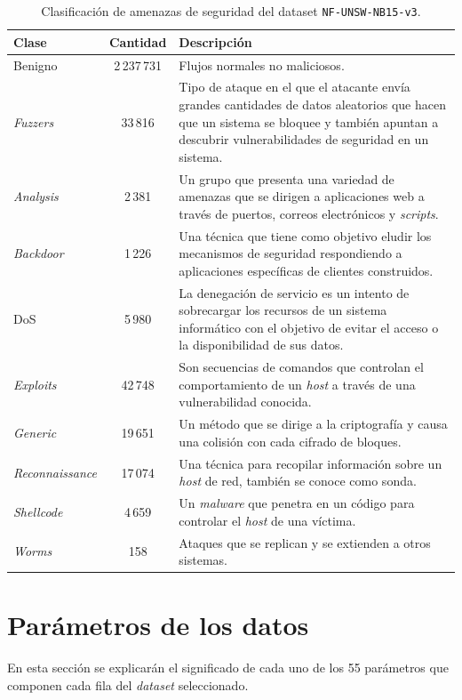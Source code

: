 \begin{table}[H]
\begin{tabular}{|l|c|>{\RaggedRight}p{8cm}|} %
\hline
\rowcolor[HTML]{C0C0C0} 
\textbf{Clase} & \textbf{Cantidad} & \textbf{Descripción} \\ \hline
Benigno & 2\,237\,731 & Flujos normales no maliciosos. \\ \hline
\textit{Fuzzers} & 33\,816 & Tipo de ataque en el que el atacante envía grandes cantidades de datos aleatorios que hacen que un sistema se bloquee y también apuntan a descubrir vulnerabilidades de seguridad en un sistema. \\ \hline
\textit{Analysis} & 2\,381 & Un grupo que presenta una variedad de amenazas que se dirigen a aplicaciones web a través de puertos, correos electrónicos y \textit{scripts}. \\ \hline
\textit{Backdoor} & 1\,226 & Una técnica que tiene como objetivo eludir los mecanismos de seguridad respondiendo a aplicaciones específicas de clientes construidos. \\ \hline
DoS & 5\,980 & La denegación de servicio es un intento de sobrecargar los recursos de un sistema informático con el objetivo de evitar el acceso o la disponibilidad de sus datos. \\ \hline
\textit{Exploits} & 42\,748 & Son secuencias de comandos que controlan el comportamiento de un \textit{host} a través de una vulnerabilidad conocida. \\ \hline
\textit{Generic} & 19\,651 & Un método que se dirige a la criptografía y causa una colisión con cada cifrado de bloques. \\ \hline
\textit{Reconnaissance} & 17\,074 & Una técnica para recopilar información sobre un \textit{host} de red, también se conoce como sonda. \\ \hline
\textit{Shellcode} & 4\,659 & Un \textit{malware} que penetra en un código para controlar el \textit{host} de una víctima. \\ \hline
\textit{Worms} & 158 & Ataques que se replican y se extienden a otros sistemas. \\ \hline
\end{tabular}
\centering
\caption{Clasificación de amenazas de seguridad del dataset \texttt{NF-UNSW-NB15-v3}.} 
\label{tab:attacks-tab}
\end{table}

\section{Parámetros de los datos} \label{sec.param-datos}
En esta sección se explicarán el significado de cada uno de los 55 parámetros que componen cada fila del \textit{dataset} seleccionado.

